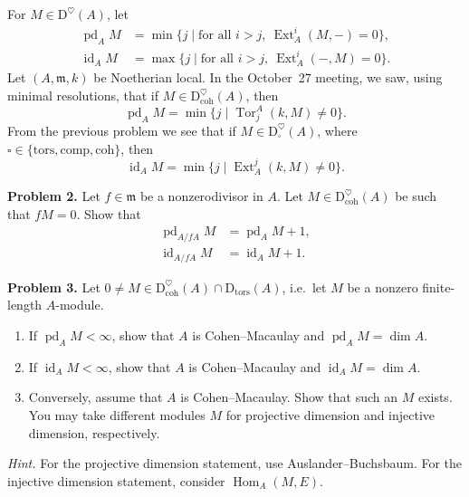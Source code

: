 \documentclass[11pt]{amsart}
\theoremstyle{definition}
\newcommand{\Hom}{\operatorname{Hom}}
\newcommand{\dimn}{\operatorname{dim}}
\newcommand{\D}{\mathrm{D}}
\newcommand{\Dcoh}{\D_{\mathrm{coh}}}
\newcommand{\m}{\mathfrak m}
\newcommand{\Dtors}{\D_{\mathrm{tors}}}
\newcommand{\id}{\operatorname{id}}
\newcommand{\Tor}{\operatorname{Tor}}
\newcommand{\Ext}{\operatorname{Ext}}
\begin{document}
For $M\in\D^\heartsuit(A)$, let
\begin{align*}
\operatorname{pd}_A M
&=\min\bigl\{j\mid \text{for all }i>j,\ \Ext_A^i(M,-)=0\bigr\},\\
\id_A M
&=\max\bigl\{j\mid \text{for all }i>j,\ \Ext_A^i(-,M)=0\bigr\}.
\end{align*}
Let $(A,\m,k)$ be Noetherian local. In the October~27 meeting, we saw, using minimal resolutions, that if $M\in\Dcoh^\heartsuit(A)$, then
\[
\operatorname{pd}_A M
=\min\bigl\{j\mid\Tor_j^A(k,M)\ne0\bigr\}.
\]
From the previous problem we see that if $M\in\D_\square^\heartsuit(A)$, where $\square\in\{\mathrm{tors},\mathrm{comp},\mathrm{coh}\}$, then
\[
\id_A M=\min\bigl\{j\mid\Ext_A^j(k,M)\ne0\bigr\}.
\]

\medskip
\noindent\textbf{Problem 2.}
Let $f\in\m$ be a nonzerodivisor in $A$. Let $M\in\Dcoh^\heartsuit(A)$ be such that $fM=0$. Show that
\begin{align*}
\operatorname{pd}_{A/fA}M&=\operatorname{pd}_A M+1,\\
\id_{A/fA}M&=\id_A M+1.
\end{align*}

\medskip
\noindent\textbf{Problem 3.}
Let $0\ne M\in\Dcoh^\heartsuit(A)\cap\Dtors(A)$, i.e.\ let $M$ be a nonzero finite-length $A$-module.
\begin{enumerate}[label=(\arabic*)]
\item If $\operatorname{pd}_A M<\infty$, show that $A$ is Cohen--Macaulay and $\operatorname{pd}_A M=\dimn A$.
\item If $\id_A M<\infty$, show that $A$ is Cohen--Macaulay and $\id_A M=\dimn A$.
\item Conversely, assume that $A$ is Cohen--Macaulay. Show that such an $M$ exists. You may take different modules $M$ for projective dimension and injective dimension, respectively.
\end{enumerate}
\noindent\emph{Hint.} For the projective dimension statement, use Auslander--Buchsbaum. For the injective dimension statement, consider $\Hom_A(M,E)$.
\end{document}
